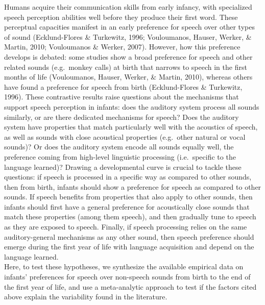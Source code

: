 \documentclass[
  english,
  man]{apa6}
\begin{document}
Humans acquire their communication skills from early infancy, with specialized speech perception abilities well before they produce their first word. These perceptual capacities manifest in an early preference for speech over other types of sound (Ecklund-Flores \& Turkewitz, 1996; Vouloumanos, Hauser, Werker, \& Martin, 2010; Vouloumanos \& Werker, 2007). However, how this preference develops is debated: some studies show a broad preference for speech and other related sounds (e.g.~monkey calls) at birth that narrows to speech in the first months of life (Vouloumanos, Hauser, Werker, \& Martin, 2010), whereas others have found a preference for speech from birth (Ecklund-Flores \& Turkewitz, 1996). These contrastive results raise questions about the mechanisms that support speech perception in infants: does the auditory system process all sounds similarly, or are there dedicated mechanisms for speech? Does the auditory system have properties that match particularly well with the acoustics of speech, as well as sounds with close acoustical properties (e.g.~other natural or vocal sounds)? Or does the auditory system encode all sounds equally well, the preference coming from high-level linguistic processing (i.e.~specific to the language learned)? Drawing a developmental curve is crucial to tackle these questions: if speech is processed in a specific way as compared to other sounds, then from birth, infants should show a preference for speech as compared to other sounds. If speech benefits from properties that also apply to other sounds, then infants should first have a general preference for acoustically close sounds that match these properties (among them speech), and then gradually tune to speech as they are exposed to speech. Finally, if speech processing relies on the same auditory-general mechanisms as any other sound, then speech preference should emerge during the first year of life with language acquisition and depend on the language learned.\\
Here, to test these hypotheses, we synthesize the available empirical data on infants' preferences for speech over non-speech sounds from birth to the end of the first year of life, and use a meta-analytic approach to test if the factors cited above explain the variability found in the literature.
\end{document}
